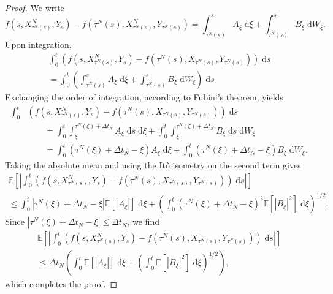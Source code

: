 \documentclass[reqno,12pt]{amsart}
\theoremstyle{plain}%
\theoremstyle{definition}
\begin{document}
\begin{proof}
    We write
    \[
        f(s, X_{\tau^N(s)}^N, Y_s) - f(\tau^N(s), X_{\tau^N(s)}^N, Y_{\tau^N(s)}) = \int_{\tau^N(s)}^s A_\xi \;\mathrm{d}\xi + \int_{\tau^N(s)}^s B_\xi \;\mathrm{d}W_\xi.
    \]
    Upon integration,
    \begin{multline*}
        \int_0^t \left(f(s, X_{\tau^N(s)}^N, Y_s) - f(\tau^N(s), X_{\tau^N(s)}, Y_{\tau^N(s)})\right)\;\mathrm{d}s  \\
        = \int_0^t \left(\int_{\tau^N(s)}^s A_\xi \;\mathrm{d}\xi + \int_{\tau^N(s)}^s B_\xi \;\mathrm{d}W_\xi\right)\;\mathrm{d}s
    \end{multline*}
    Exchanging the order of integration, according to Fubini's theorem, yields
    \begin{align*}
        \int_0^t & \left(f(s, X_{\tau^N(s)}^N, Y_s) - f(\tau^N(s), X_{\tau^N(s)}, Y_{\tau^N(s)})\right)\;\mathrm{d}s \\
        & \qquad = \int_0^t \int_\xi^{\tau^N(\xi)+\Delta t_N} A_\xi \;\mathrm{d}s\;\mathrm{d}\xi + \int_0^t \int_\xi^{\tau^N(\xi) + \Delta t_N} B_\xi \;\mathrm{d}s\;\mathrm{d}W_\xi \\
        & \qquad = \int_0^t (\tau^N(\xi)+\Delta t_N - \xi) A_\xi \;\mathrm{d}\xi + \int_0^t (\tau^N(\xi) + \Delta t_N - \xi) B_\xi \;\mathrm{d}W_\xi.
    \end{align*}
    Taking the absolute mean and using the It\^o isometry on the second term gives
    \begin{multline*}
        \mathbb{E}\left[\left|\int_0^t \left(f(s, X_{\tau^N(s)}^N, Y_s) - f(\tau^N(s), X_{\tau^N(s)}, Y_{\tau^N(s)})\right)\;\mathrm{d}s\right|\right]  \\
        \leq \int_0^t |\tau^N(\xi)+\Delta t_N - \xi| \mathbb{E}[|A_\xi|] \;\mathrm{d}\xi + \left(\int_0^t (\tau^N(\xi) + \Delta t_N - \xi)^2 \mathbb{E}[|B_\xi|^2] \;\mathrm{d}\xi \right)^{1/2}.
    \end{multline*}
    Since $|\tau^N(\xi)+\Delta t_N - \xi| \leq \Delta t_N$, we find
    \begin{multline*}
        \mathbb{E}\left[\left|\int_0^t \left(f(s, X_{\tau^N(s)}^N, Y_s) - f(\tau^N(s), X_{\tau^N(s)}, Y_{\tau^N(s)})\right)\;\mathrm{d}s\right|\right]  \\
        \leq \Delta t_N \left(\int_0^t \mathbb{E}[|A_\xi|] \;\mathrm{d}\xi + \left(\int_0^t \mathbb{E}[|B_\xi|^2] \;\mathrm{d}\xi \right)^{1/2}\right),
    \end{multline*}
    which completes the proof.
\end{proof}
\end{document}
